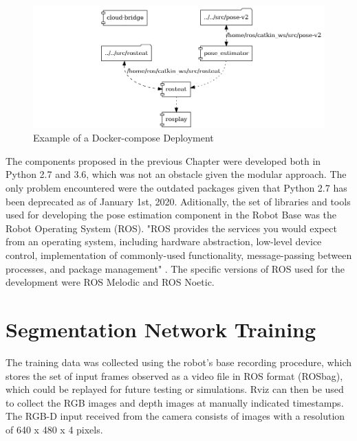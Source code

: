 \begin{figure}[h]
    \centering
    \includegraphics[width=1\textwidth]{images/cow_docker_topology.png}
    \caption{Example of a Docker-compose Deployment}
    \label{fig:cow_docker_topology}
\end{figure}

The components proposed in the previous Chapter were developed both in Python 2.7 and 3.6, which was not an obstacle given the modular approach. The only problem encountered were the outdated packages given that Python 2.7 has been deprecated as of January 1st, 2020. 
Aditionally, the set of libraries and tools used for developing the pose estimation component in the Robot Base was the Robot Operating System (ROS). "ROS provides the services you would expect from an operating system, including hardware abstraction, low-level device control, implementation of commonly-used functionality, message-passing between processes, and package management" \cite{2020ROS}. The specific versions of ROS used for the development were ROS Melodic and ROS Noetic.


\section{Segmentation Network Training}\label{chap:4:train_data}

The training data was collected using the robot's base recording procedure, which stores the set of input frames observed as a video file in ROS format (ROSbag), which could be replayed for future testing or simulations. Rviz can then be used to collect the RGB images and depth images at manually indicated timestamps. The RGB-D input received from the camera consists of images with a resolution of 640 x 480 x 4 pixels. 

